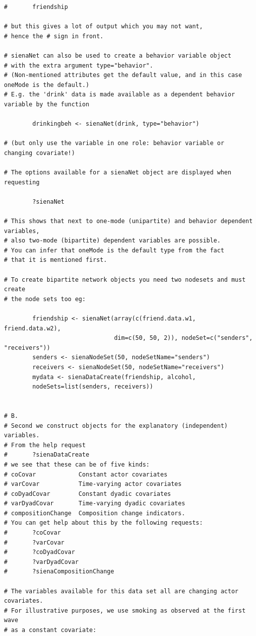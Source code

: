 \documentclass[a4paper,fleqn]{article}
\newcommand{\+}{\, + \,}
\begin{document}
{\begin{verbatim}
#       friendship

# but this gives a lot of output which you may not want,
# hence the # sign in front.

# sienaNet can also be used to create a behavior variable object
# with the extra argument type="behavior".
# (Non-mentioned attributes get the default value, and in this case oneMode is the default.)
# E.g. the 'drink' data is made available as a dependent behavior variable by the function

        drinkingbeh <- sienaNet(drink, type="behavior")

# (but only use the variable in one role: behavior variable or changing covariate!)

# The options available for a sienaNet object are displayed when requesting

        ?sienaNet

# This shows that next to one-mode (unipartite) and behavior dependent variables,
# also two-mode (bipartite) dependent variables are possible.
# You can infer that oneMode is the default type from the fact
# that it is mentioned first.

# To create bipartite network objects you need two nodesets and must create
# the node sets too eg:

        friendship <- sienaNet(array(c(friend.data.w1, friend.data.w2),
                               dim=c(50, 50, 2)), nodeSet=c("senders", "receivers"))
        senders <- sienaNodeSet(50, nodeSetName="senders")
        receivers <- sienaNodeSet(50, nodeSetName="receivers")
        mydata <- sienaDataCreate(friendship, alcohol,
        nodeSets=list(senders, receivers))


# B.
# Second we construct objects for the explanatory (independent) variables.
# From the help request
#       ?sienaDataCreate
# we see that these can be of five kinds:
# coCovar            Constant actor covariates
# varCovar           Time-varying actor covariates
# coDyadCovar        Constant dyadic covariates
# varDyadCovar       Time-varying dyadic covariates
# compositionChange  Composition change indicators.
# You can get help about this by the following requests:
#       ?coCovar
#       ?varCovar
#       ?coDyadCovar
#       ?varDyadCovar
#       ?sienaCompositionChange

# The variables available for this data set all are changing actor covariates.
# For illustrative purposes, we use smoking as observed at the first wave
# as a constant covariate:


\end{verbatim}}
\end{document}
